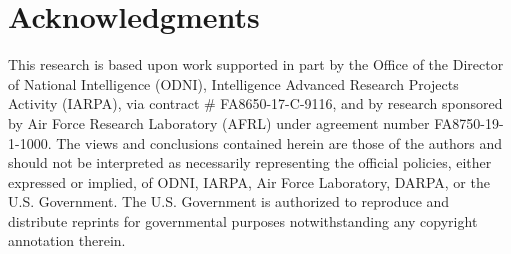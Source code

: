 \section{Acknowledgments}



This research is based upon work supported in part by the Office of the Director of National Intelligence (ODNI), Intelligence Advanced Research Projects Activity (IARPA), via contract \# FA8650-17-C-9116, and by research sponsored by Air Force Research Laboratory (AFRL) under agreement number FA8750-19-1-1000. The views and conclusions contained herein are those of the authors and should not be interpreted as necessarily representing the official policies, either expressed or implied, of ODNI, IARPA, Air Force Laboratory, DARPA, or the U.S. Government. The U.S. Government is authorized to reproduce and distribute reprints for governmental purposes notwithstanding any copyright annotation therein.
